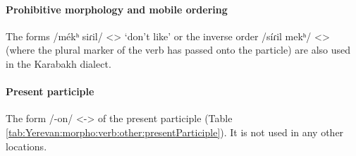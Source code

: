 \begin{table}[H]
	\centering
	\caption{Use of imperative 2SG forms with final /-ɑ/ in the Yerevan dialect (Etchmiadzin area) vs. using /-i/ in Yerevan proper}
	\label{tab:Yerevan:morpho:verb:other:ImpA}
\end{table}

\paragraph{Prohibitive morphology and mobile ordering} 

The forms /m\'ekʰ siɾil/ <> `don't like' or the inverse order /s\'iɾil mekʰ/ <> (where the plural marker of the verb has passed onto the particle) are also used in the Karabakh dialect.


\paragraph{Present participle}

The form /-on/ <-> of the present participle (Table \ref{tab:Yerevan:morpho:verb:other:presentParticiple}). It is not used in any other locations. 



